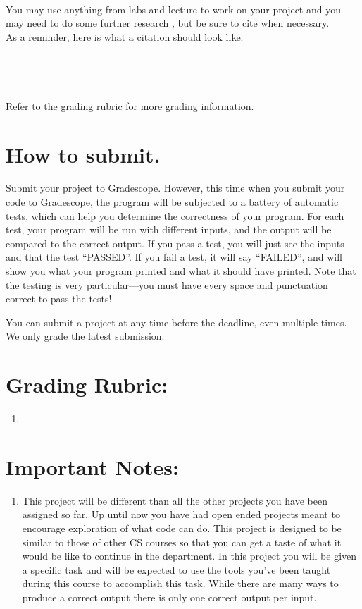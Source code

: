 \documentclass[11pt, letterpaper, onecolumn, oneside, final]{article}
\begin{document}
  \\
  You may use anything from labs and lecture to work on your project and you may need to do some further research , but be sure to cite when necessary.
  \\ As a reminder, here is what a citation should look like: \\
    \\
    \\
    \\ 
    \\
    Refer to the grading rubric for more grading information.
    
\section{How to submit.}

    Submit your project to Gradescope. However, this time when you submit your code to Gradescope, the program will be subjected to a battery of automatic tests, which can help you determine the correctness of your program. For each test, your program will be run with different inputs, and the output will be compared to the correct output. If you pass a test, you will just see the inputs and that the test ``PASSED''. If you fail a test, it will say ``FAILED'', and will show you what your program printed and what it should have printed. Note that the testing is very particular---you must have every space and punctuation correct to pass the tests! 
    
    You can submit a project at any time before the deadline, even multiple times. We only grade the latest submission.
    \section{Grading Rubric:} 
    \begin{enumerate}
        \item 

    \end{enumerate}
    \section{Important Notes:} 
    \begin{enumerate}
        \item This project will be different than all the other projects you have been assigned so far. Up until now you have had open ended projects meant to encourage exploration of what code can do. This project is designed to be similar to those of other CS courses so that you can get a taste of what it would be like to continue in the department. In this project you will be given a specific task and will be expected to use the tools you've been taught during this course to accomplish this task. While there are many ways to produce a correct output there is only one correct output per input.
    \end{enumerate}

    
\end{document}
